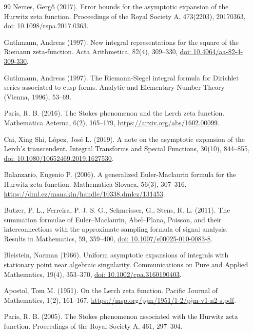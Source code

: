 \documentclass[11pt,a4paper]{article}
\begin{document}
\begin{thebibliography}{99}
 Nemes, Gergő (2017). Error bounds for the asymptotic expansion of the Hurwitz zeta function. Proceedings of the Royal Society A, 473(2203), 20170363, \href{https://doi.org/10.1098/rspa.2017.0363}{doi: 10.1098/rspa.2017.0363}.

 Guthmann, Andreas (1997). New integral representations for the square of the Riemann zeta-function. Acta Arithmetica, 82(4), 309--330, \href{https://doi.org/10.4064/aa-82-4-309-330}{doi: 10.4064/aa-82-4-309-330}.

 Guthmann, Andreas (1997). The Riemann-Siegel integral formula for Dirichlet series associated to cusp forms. Analytic and Elementary Number Theory (Vienna, 1996), 53--69.

 Paris, R. B. (2016). The Stokes phenomenon and the Lerch zeta function. Mathematica Aeterna, 6(2), 165--179, \url{https://arxiv.org/abs/1602.00099}.

 Cai, Xing Shi, López, José L. (2019). A note on the asymptotic expansion of the Lerch's transcendent. Integral Transforms and Special Functions, 30(10), 844--855, \href{https://doi.org/10.1080/10652469.2019.1627530}{doi: 10.1080/10652469.2019.1627530}.

 Balanzario, Eugenio P. (2006). A generalized Euler-Maclaurin formula for the Hurwitz zeta function. Mathematica Slovaca, 56(3), 307--316, \url{https://dml.cz/manakin/handle/10338.dmlcz/131453}.

 Butzer, P. L., Ferreira, P. J. S. G., Schmeisser, G., Stens, R. L. (2011). The summation formulae of Euler--Maclaurin, Abel--Plana, Poisson, and their interconnections with the approximate sampling formula of signal analysis. Results in Mathematics, 59, 359--400, \href{https://doi.org/10.1007/s00025-010-0083-8}{doi: 10.1007/s00025-010-0083-8}.

 Bleistein, Norman (1966). Uniform asymptotic expansions of integrals with stationary point near algebraic singularity. Communications on Pure and Applied Mathematics, 19(4), 353--370, \href{https://doi.org/10.1002/cpa.3160190403}{doi: 10.1002/cpa.3160190403}.

 Apostol, Tom M. (1951). On the Lerch zeta function. Pacific Journal of Mathematics, 1(2), 161--167, \url{https://msp.org/pjm/1951/1-2/pjm-v1-n2-s.pdf}.

 Paris, R. B. (2005). The Stokes phenomenon associated with the Hurwitz zeta function. Proceedings of the Royal Society A, 461, 297--304.


\end{thebibliography}
\end{document}
